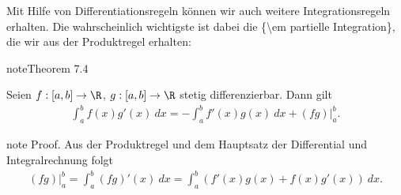 \documentclass[letterpaper,10pt,english]{jupyterBook}
\begin{document}
Mit Hilfe von Differentiationsregeln können wir auch weitere Integrationsregeln erhalten. Die wahrscheinlich
wichtigste ist dabei die \{\textbackslash{}em partielle Integration\}, die wir aus der Produktregel erhalten:
\label{integration/hdi:theorem-6}
\begin{sphinxadmonition}{note}{Theorem 7.4}



Seien \(f:[a,b] \rightarrow \R\), \(g:[a,b] \rightarrow \R\) stetig differenzierbar. Dann gilt
\begin{equation*}
\begin{split} \int_a^b f(x) g'(x) ~dx = - \int_a^b f'(x) g(x)~dx + (fg)\vert_a^b.\end{split}
\end{equation*}\end{sphinxadmonition}

\begin{sphinxadmonition}{note}
Proof. Aus der Produktregel und dem Hauptsatz der Differential\sphinxhyphen{} und Integralrechnung folgt
\begin{equation*}
\begin{split} (fg)\vert_a^b = \int_a^b (fg)'(x)~dx = \int_a^b (f'(x)g(x) + f(x)g'(x))~dx.\end{split}
\end{equation*}\end{sphinxadmonition}
\end{document}
